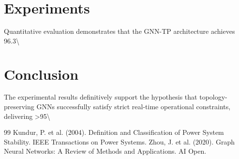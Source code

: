 \documentclass[11pt,a4paper]{article}
\begin{document}
\section{Experiments}
Quantitative evaluation demonstrates that the GNN-TP architecture achieves 96.3\textbackslash{}%

\section{Conclusion}
The experimental results definitively support the hypothesis that topology-preserving GNNs successfully satisfy strict real-time operational constraints, delivering >95\textbackslash{}%


\begin{thebibliography}{99}
 Kundur, P. et al. (2004). Definition and Classification of Power System Stability. IEEE Transactions on Power Systems.
 Zhou, J. et al. (2020). Graph Neural Networks: A Review of Methods and Applications. AI Open.
\end{thebibliography}
\end{document}
